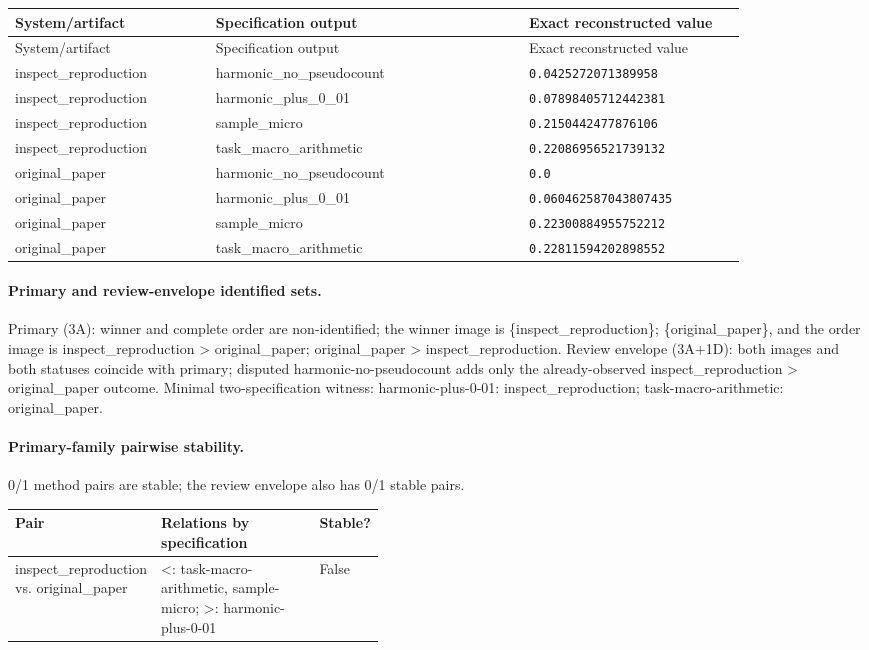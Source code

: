 \begingroup
\scriptsize
\begin{longtable}{@{}p{0.25\linewidth}p{0.39\linewidth}p{0.27\linewidth}@{}}
\toprule
System/artifact & Specification output & Exact reconstructed value \\
\midrule
\endfirsthead
\toprule System/artifact & Specification output & Exact reconstructed value \\
\midrule
\endhead
inspect\_reproduction & harmonic\_no\_pseudocount & \texttt{0.0425272071389958} \\
inspect\_reproduction & harmonic\_plus\_0\_01 & \texttt{0.07898405712442381} \\
inspect\_reproduction & sample\_micro & \texttt{0.2150442477876106} \\
inspect\_reproduction & task\_macro\_arithmetic & \texttt{0.22086956521739132} \\
original\_paper & harmonic\_no\_pseudocount & \texttt{0.0} \\
original\_paper & harmonic\_plus\_0\_01 & \texttt{0.060462587043807435} \\
original\_paper & sample\_micro & \texttt{0.22300884955752212} \\
original\_paper & task\_macro\_arithmetic & \texttt{0.22811594202898552} \\
\bottomrule
\end{longtable}
\endgroup

\paragraph{Primary and review-envelope identified sets.} Primary (3A): winner and complete order are non-identified; the winner image is \{inspect\_reproduction\}; \{original\_paper\}, and the order image is inspect\_reproduction > original\_paper; original\_paper > inspect\_reproduction. Review envelope (3A+1D): both images and both statuses coincide with primary; disputed harmonic-no-pseudocount adds only the already-observed inspect\_reproduction > original\_paper outcome. Minimal two-specification witness: harmonic-plus-0-01: inspect\_reproduction; task-macro-arithmetic: original\_paper.

\paragraph{Primary-family pairwise stability.} 0/1 method pairs are stable; the review envelope also has 0/1 stable pairs.
\begin{center}\scriptsize
\begin{tabularx}{\linewidth}{@{}p{0.34\linewidth}Xp{0.09\linewidth}@{}}
\toprule Pair & Relations by specification & Stable? \\
\midrule
inspect\_reproduction vs. original\_paper & <: task-macro-arithmetic, sample-micro; >: harmonic-plus-0-01 & False \\
\bottomrule\end{tabularx}\end{center}

